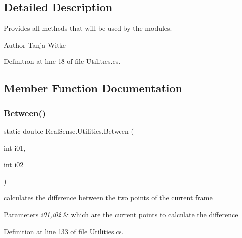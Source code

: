 \subsection{Detailed Description}
Provides all methods that will be used by the modules.

\begin{DoxyAuthor}{Author}
Tanja Witke 
\end{DoxyAuthor}


Definition at line 18 of file Utilities.\+cs.



\subsection{Member Function Documentation}
\mbox{\label{class_real_sense_1_1_utilities_ac8eceed552d66f2f614160cf84e605e2}} 
\subsubsection{\texorpdfstring{Between()}{Between()}}
{\footnotesize\ttfamily static double Real\+Sense.\+Utilities.\+Between (\begin{DoxyParamCaption}\item[{int}]{i01,  }\item[{int}]{i02 }\end{DoxyParamCaption})\hspace{0.3cm}{\ttfamily [static]}}

calculates the difference between the two points of the current frame 
\begin{DoxyParams}{Parameters}
{\em i01,i02} & which are the current points to calculate the difference \\
\hline
\end{DoxyParams}


Definition at line 133 of file Utilities.\+cs.

\mbox{\label{class_real_sense_1_1_utilities_a4185e676947ed9d5da9a5ce28e922ff6}} 
